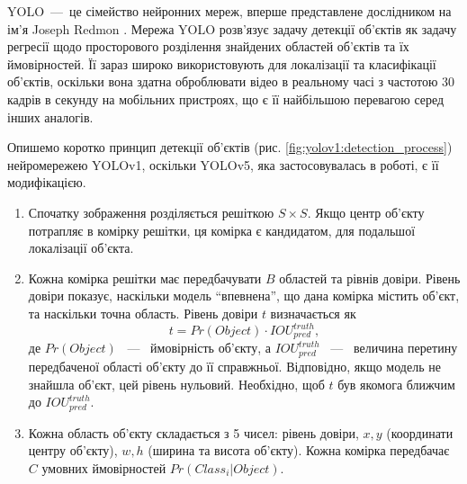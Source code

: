 YOLO~---~це сімейство нейронних мереж, вперше представлене дослідником на ім'я Joseph Redmon 
\cite{bib:yolov1}.
Мережа YOLO розв'язує задачу детекції об'єктів як задачу регресії
щодо просторового розділення знайдених областей об'єктів та їх
ймовірностей. Її зараз широко використовують для локалізації та класифікації об'єктів,
оскільки вона здатна оброблювати відео в реальному часі з частотою 30 кадрів в секунду
на мобільних пристроях, що є її найбільшою перевагою серед інших аналогів.

Опишемо коротко принцип детекції об'єктів (рис. \ref{fig:yolov1:detection_process}) нейромережею YOLOv1,
оскільки YOLOv5, яка застосовувалась в роботі, є її модифікацією.
\begin{enumerate}
    \item Спочатку зображення розділяється решіткою $S \times S$.
          Якщо центр об'єкту потрапляє в комірку решітки, ця комірка
          є кандидатом, для подальшої локалізації об'єкта.
    \item Кожна комірка решітки має передбачувати $B$ областей та рівнів
          довіри. Рівень довіри показує, наскільки модель ``впевнена'',
          що дана комірка містить об'єкт, та наскільки точна область.
          Рівень довіри $t$ визначається  як
          \begin{equation*}
              t = Pr(Object) \cdot {IOU}_{pred}^{truth},
          \end{equation*}
          де $Pr(Object)$ ~---~ ймовірність об'єкту, а ${IOU}_{pred}^{truth}$ ~---~ величина
          перетину передбаченої області об'єкту до її справжньої.
          Відповідно, якщо модель не знайшла об'єкт, цей рівень нульовий.
          Необхідно, щоб $t$ був якомога ближчим до ${IOU}_{pred}^{truth}$.
    \item Кожна область об'єкту складається з 5 чисел: рівень довіри,
          $x, y$ (координати центру об'єкту),  $w, h$ (ширина та висота об'єкту).
          Кожна комірка передбачає $C$ умовних ймовірностей $Pr(Class_i|Object)$.
\end{enumerate}

